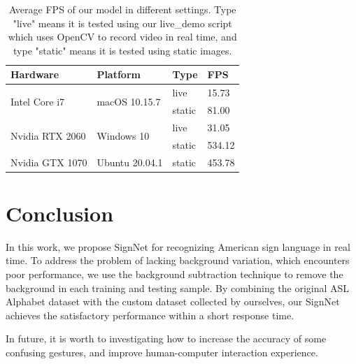 \documentclass[10pt,twocolumn,letterpaper]{article}
\begin{document}
\begin{table}[h]
\begin{center}
\begin{tabular}{|l|l|l|l|}
\hline
Hardware              & Platform                & Type   & FPS \\ \hline\hline
\multirow{2}{*}{Intel Core i7}   & \multirow{2}{*}{macOS 10.15.7}  & live   & 15.73  \\ \cline{3-4} 
                      &                         & static & 81.00  \\ \hline
\multirow{2}{*}{Nvidia RTX 2060} & \multirow{2}{*}{Windows 10} & live   & 31.05  \\ \cline{3-4} 
                      &                         & static & 534.12 \\ \hline
Nvidia GTX 1070 & Ubuntu 20.04.1 & static & 453.78 \\ \hline                    
\end{tabular}
\end{center}
\caption{Average FPS of our model in different settings. Type "live" means it is tested using our live\_demo script which uses OpenCV to record video in real time, and type "static" means it is tested using static images.}
\label{table:fps}
\end{table}


\section{Conclusion}
In this work, we propose SignNet for recognizing American sign language in real time. To address the problem of lacking background variation, which encounters poor performance, we use the background subtraction technique to remove the background in each training and testing sample. By combining the original ASL Alphabet dataset with the custom dataset collected by ourselves, our SignNet achieves the satisfactory performance within a short response time.

In future, it is worth to investigating how to increase the accuracy of some confusing gestures, and improve human-computer interaction experience.



{\small


}
\end{document}
